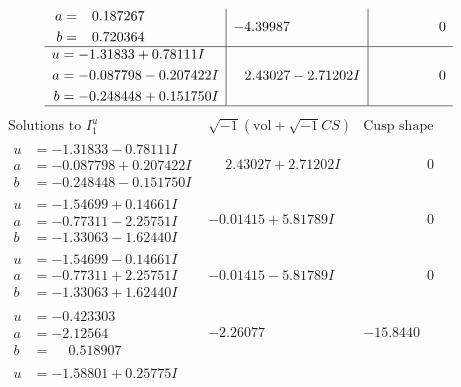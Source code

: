 \documentclass[1p]{elsarticle_modified}
\theoremstyle{definition}
\newcommand{\I}{\sqrt{-1}}
\begin{document}
$$\begin{array}{c|c|c}
\begin{aligned}
a &= \phantom{-}0.187267\phantom{ +0.000000I} \\
b &= \phantom{-}0.720364\phantom{ +0.000000I}\end{aligned}
 & -4.39987\phantom{ +0.000000I} & \phantom{-0.000000 } 0 \\ \hline\begin{aligned}
u &= -1.31833 + 0.78111 I \\
a &= -0.087798 - 0.207422 I \\
b &= -0.248448 + 0.151750 I\end{aligned}
 & \phantom{-}2.43027 - 2.71202 I & \phantom{-0.000000 } 0\\
 \hline 
 \end{array}$$\newpage$$\begin{array}{c|c|c}  
\text{Solutions to }I^u_{1}& \I (\text{vol} + \sqrt{-1}CS) & \text{Cusp shape}\\
 \hline 
\begin{aligned}
u &= -1.31833 - 0.78111 I \\
a &= -0.087798 + 0.207422 I \\
b &= -0.248448 - 0.151750 I\end{aligned}
 & \phantom{-}2.43027 + 2.71202 I & \phantom{-0.000000 } 0 \\ \hline\begin{aligned}
u &= -1.54699 + 0.14661 I \\
a &= -0.77311 - 2.25751 I \\
b &= -1.33063 - 1.62440 I\end{aligned}
 & -0.01415 + 5.81789 I & \phantom{-0.000000 } 0 \\ \hline\begin{aligned}
u &= -1.54699 - 0.14661 I \\
a &= -0.77311 + 2.25751 I \\
b &= -1.33063 + 1.62440 I\end{aligned}
 & -0.01415 - 5.81789 I & \phantom{-0.000000 } 0 \\ \hline\begin{aligned}
u &= -0.423303\phantom{ +0.000000I} \\
a &= -2.12564\phantom{ +0.000000I} \\
b &= \phantom{-}0.518907\phantom{ +0.000000I}\end{aligned}
 & -2.26077\phantom{ +0.000000I} & -15.8440\phantom{ +0.000000I} \\ \hline\begin{aligned}
u &= -1.58801 + 0.25775 I \\

\end{aligned}
\end{array}$$
\end{document}
